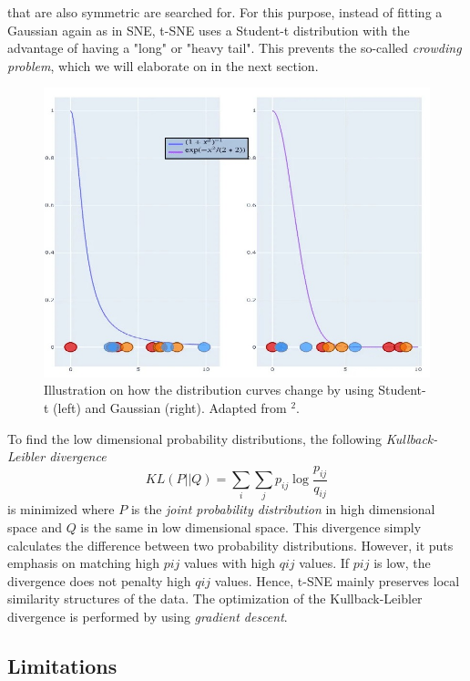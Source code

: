 that are also symmetric are searched for. For this purpose, instead of fitting a Gaussian again as in SNE, t-SNE uses a Student-t distribution with the advantage of having a "long" or "heavy tail". This prevents the so-called \textit{crowding problem}, which we will elaborate on in the next section.
\begin{figure}[!]
	\centering
	\includegraphics[width=\columnwidth]{images/t-sne_dists.jpg}
	\caption[t-SNE different distributions]{Illustration on how the distribution curves change by using Student-t (left) and Gaussian (right). Adapted from $^2$.}
    \label{fig:t-sne_dists}
\end{figure}
To find the low dimensional probability distributions, the following \textit{Kullback-Leibler divergence} 
\begin{equation}
    KL(P||Q)= \sum_i \sum_j p_{ij} \log \frac{p_{ij}}{q_{ij}}
\end{equation}
is minimized where $P$ is the \textit{joint probability distribution} in high dimensional space and $Q$ is the same in low dimensional space. This divergence simply calculates the difference between two probability distributions. However, it puts emphasis on matching high $p{ij}$ values with high $q{ij}$ values. If $p{ij}$ is low, the divergence does not penalty high $q{ij}$ values. Hence, t-SNE mainly preserves local similarity structures of the data. The optimization of the Kullback-Leibler divergence is performed by using \textit{gradient descent}. \cite{Gisbrecht15}

\subsection{Limitations}

